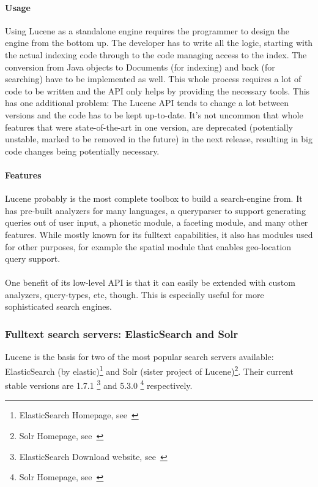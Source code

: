 \pagebreak

\paragraph{Usage}
Using Lucene as a standalone engine requires the programmer to design the engine from the bottom up. The developer has to write all the logic, starting with the actual indexing code through to the code managing access to the index. The conversion from Java objects to Documents (for indexing) and back (for searching) have to be implemented as well. This whole process requires a lot of code to be written and the API only helps by providing the necessary tools. This has one additional problem: The Lucene API tends to change a lot between versions and the code has to be kept up-to-date. It's not uncommon that whole features that were state-of-the-art in one version, are deprecated (potentially unstable, marked to be removed in the future) in the next release, resulting in big code changes being potentially necessary.

\paragraph{Features}
Lucene probably is the most complete toolbox to build a search-engine from. It has pre-built analyzers for many languages, a queryparser to support generating queries out of user input, a phonetic module, a faceting module, and many other features. While mostly known for its fulltext capabilities, it also has modules used for other purposes, for example the spatial module that enables geo-location query support.
\\\\
One benefit of its low-level API is that it can easily be extended with custom analyzers, query-types, etc, though. This is especially useful for more sophisticated search engines.

\pagebreak

\subsubsection{Fulltext search servers: ElasticSearch and Solr}
Lucene is the basis for two of the most popular search servers available: ElasticSearch (by elastic)\footnote{ElasticSearch Homepage, see~\cite{elasticsearch_homepage}} and Solr (sister project of Lucene)\footnote{Solr Homepage, see~\cite{solr_homepage}}. Their current stable versions are 1.7.1 \footnote{ElasticSearch Download website, see~\cite{elasticsearch_downloads_website}} and 5.3.0 \footnote{Solr Homepage, see~\cite{solr_homepage}} respectively.

